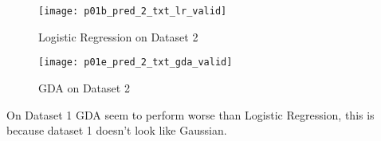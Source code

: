 \begin{answer}

    \begin{figure}[h]
        \centering
        \texttt{[image: p01b\_pred\_2\_txt\_lr\_valid]}
        \caption{Logistic Regression on Dataset 2}
    \end{figure}
    
    \begin{figure}[h]
        \centering
        \texttt{[image: p01e\_pred\_2\_txt\_gda\_valid]}
        \caption{GDA on Dataset 2}
    \end{figure}

 On Dataset 1 GDA seem to perform worse than Logistic Regression, this 
 is because dataset 1 doesn't look like Gaussian.
\end{answer}
